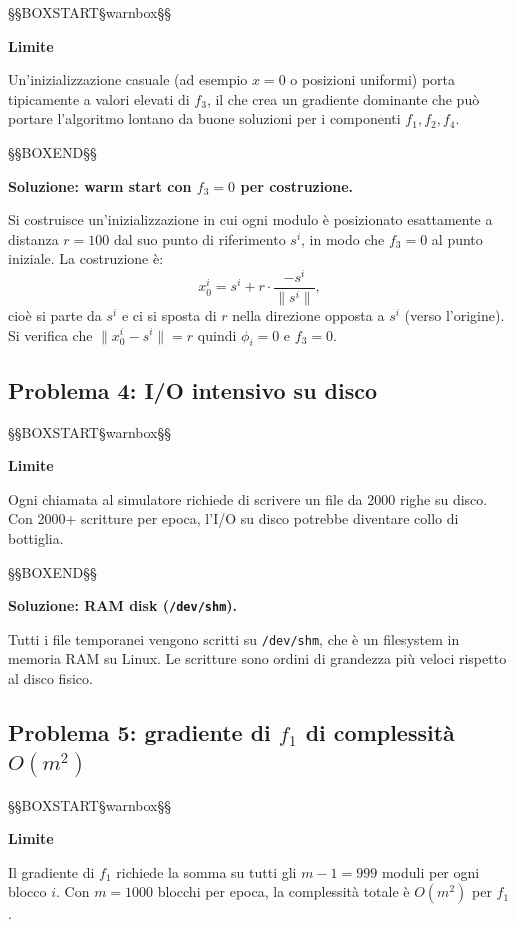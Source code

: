 \documentclass[12pt,a4paper]{article}
\theoremstyle{definition}
\begin{document}
\noindent §§BOXSTART§warnbox§§

\textbf{Limite}


Un'inizializzazione casuale (ad esempio $x = 0$ o posizioni uniformi) porta tipicamente a
valori elevati di $f_3$, il che crea un gradiente dominante che può portare l'algoritmo
lontano da buone soluzioni per i componenti $f_1, f_2, f_4$.


\noindent §§BOXEND§§



\textbf{Soluzione: warm start con $f_3 = 0$ per costruzione.}

Si costruisce un'inizializzazione in cui ogni modulo è posizionato esattamente a distanza $r = 100$
dal suo punto di riferimento $s^i$, in modo che $f_3 = 0$ al punto iniziale.
La costruzione è:
\[
  x^i_0 = s^i + r \cdot \frac{-s^i}{\|s^i\|},
\]
cioè si parte da $s^i$ e ci si sposta di $r$ nella direzione opposta a $s^i$ (verso l'origine).
Si verifica che $\|x^i_0 - s^i\| = r$ quindi $\phi_i = 0$ e $f_3 = 0$.

\subsection{Problema 4: I/O intensivo su disco}



\noindent §§BOXSTART§warnbox§§

\textbf{Limite}


Ogni chiamata al simulatore richiede di scrivere un file da 2000 righe su disco.
Con 2000+ scritture per epoca, l'I/O su disco potrebbe diventare collo di bottiglia.


\noindent §§BOXEND§§



\textbf{Soluzione: RAM disk (\texttt{/dev/shm}).}

Tutti i file temporanei vengono scritti su \texttt{/dev/shm}, che è un filesystem in memoria RAM
su Linux. Le scritture sono ordini di grandezza più veloci rispetto al disco fisico.

\subsection{Problema 5: gradiente di $f_1$ di complessità $O(m^2)$}



\noindent §§BOXSTART§warnbox§§

\textbf{Limite}


Il gradiente di $f_1$ richiede la somma su tutti gli $m-1 = 999$ moduli per ogni blocco $i$.
Con $m = 1000$ blocchi per epoca, la complessità totale è $O(m^2)$ per $f_1$.
\end{document}
